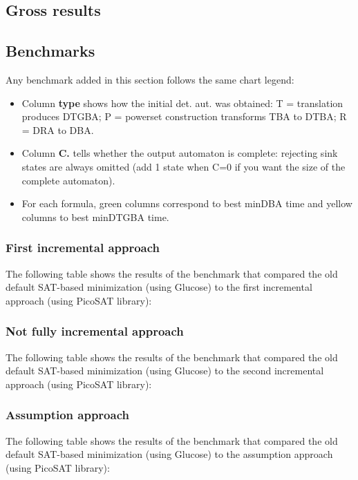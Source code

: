 \begin{landscape}
\chapter{Gross results}

\section{Benchmarks}
Any benchmark added in this section follows the same chart legend:\\
\begin{itemize}
 \item Column \textbf{type} shows how the initial det. aut. was obtained: T = translation produces DTGBA;
       P = powerset construction transforms TBA to DTBA; R = DRA to DBA.
 \item Column \textbf{C.} tells whether the output automaton is complete: rejecting sink states are always
       omitted (add 1 state when C=0 if you want the size of the complete automaton).
 \item For each formula, green columns correspond to best minDBA time and yellow columns to best minDTGBA
       time.
\end{itemize}

\subsection{First incremental approach}
\label{glu_vs_incr1_complete}
The following table shows the results of the benchmark that compared the old default SAT-based minimization
(using Glucose) to the first incremental approach (using PicoSAT library):\\

\subsection{Not fully incremental approach}
\label{glu_vs_incr2_complete}
The following table shows the results of the benchmark that compared the old default SAT-based minimization
(using Glucose) to the second incremental approach (using PicoSAT library):\\

\subsection{Assumption approach}
\label{glu_vs_assume_complete}
The following table shows the results of the benchmark that compared the old default SAT-based minimization
(using Glucose) to the assumption approach (using PicoSAT library):\\


\end{landscape}
